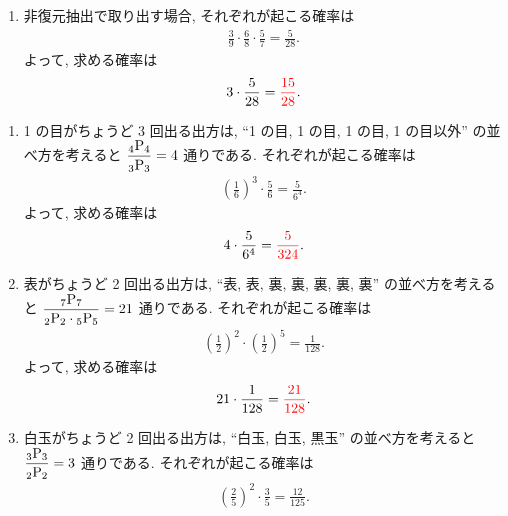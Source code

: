 \begin{qenumerate}
{\begin{enumerate}
{				\begin{align}
					\frac{3}{9}\cdot\left(\frac{6}{9}\right)^{2} = \frac{4}{27}.
				\end{align}
				よって, 求める確率は
				\begin{align}
					3\cdot\frac{4}{27} = \red{\frac{4}{9}}.
				\end{align}
			}
			\item{
				非復元抽出で取り出す場合, それぞれが起こる確率は
				\begin{align}
					\frac{3}{9}\cdot\frac{6}{8}\cdot\frac{5}{7} = \frac{5}{28}.
				\end{align}
				よって, 求める確率は
				\begin{align}
					3\cdot\frac{5}{28} = \textcolor{red}{\frac{15}{28}}.
				\end{align}
			}
		\end{enumerate}
	}
	\item{
		\begin{enumerate}
			\item{
				1 の目がちょうど 3 回出る出方は, ``1 の目, 1 の目, 1 の目, 1 の目以外'' の並べ方を考えると $\dfrac{{{}_{4}\mathrm{P}_{4}}}{{{}_{3}\mathrm{P}_{3}}} = 4$ 通りである.
				それぞれが起こる確率は
				\begin{align}
					\left(\frac{1}{6}\right)^{3}\cdot\frac{5}{6} = \frac{5}{6^{4}}.
				\end{align}
				よって, 求める確率は
				\begin{align}
					4\cdot\frac{5}{6^{4}} = \textcolor{red}{\frac{5}{324}}.
				\end{align}
			}
			\item{
				表がちょうど 2 回出る出方は, ``表, 表, 裏, 裏, 裏, 裏, 裏'' の並べ方を考えると $\dfrac{{{}_{7}\mathrm{P}_{7}}}{{{}_{2}\mathrm{P}_{2}}\cdot{{}_{5}\mathrm{P}_{5}}} = 21$ 通りである.
				それぞれが起こる確率は
				\begin{align}
					\left(\frac{1}{2}\right)^{2}\cdot\left(\frac{1}{2}\right)^{5} = \frac{1}{128}.
				\end{align}
				よって, 求める確率は
				\begin{align}
					21\cdot\frac{1}{128} = \textcolor{red}{\frac{21}{128}}.
				\end{align}
			}
			\item{
				白玉がちょうど 2 回出る出方は, ``白玉, 白玉, 黒玉'' の並べ方を考えると $\dfrac{{{}_{3}\mathrm{P}_{3}}}{{{}_{2}\mathrm{P}_{2}}} = 3$ 通りである.
				それぞれが起こる確率は
				\begin{align}
					\left(\frac{2}{5}\right)^{2}\cdot\frac{3}{5} = \frac{12}{125}.
				\end{align}
}
\end{enumerate}}
\end{qenumerate}
